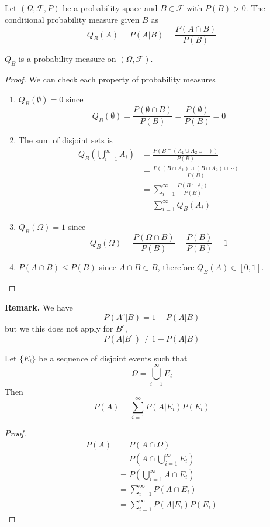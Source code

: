 \begin{definition}
    Let $(\Omega, \mathcal{F}, P)$ be a probability space and $B \in \mathcal{F}$ with $P(B) > 0$. The conditional probability measure given $B$ as 
    \[Q_B(A) = P(A|B) = \frac{P(A \cap B)}{P(B)}\]
\end{definition}
\begin{theorem}
    $Q_B$ is a probability measure on $(\Omega, \mathcal{F})$.
\end{theorem}
\begin{proof}
    We can check each property of probability measures
    \begin{enumerate}[label=(\roman*)]
        \item $Q_B(\emptyset) = 0$ since 
        \[Q_B(\emptyset) = \frac{P(\emptyset \cap B)}{P(B)} = \frac{P(\emptyset)}{P(B)}= 0\]
        \item The sum of disjoint sets is
        \begin{align*}
            Q_B\left(\bigcup_{i=1}^\infty A_i\right) &= \frac{P(B \cap (A_1 \cup A_2 \cup \cdots))}{P(B)}\\
            &= \frac{P((B \cap A_1) \cup (B \cap A_2) \cup \cdots)}{P(B)}\\
            &= \sum_{i=1}^\infty \frac{P(B \cap A_i)}{P(B)}\\
            &= \sum_{i=1}^\infty Q_B(A_i)
        \end{align*}
        \item $Q_B(\Omega) = 1$ since
        \[Q_B(\Omega) = \frac{P(\Omega\cap B)}{P(B)} = \frac{P(B)}{P(B)} = 1\]
        \item $P(A \cap B) \leq P(B)$ since $A \cap B \subset B$, therefore $Q_B(A) \in [0,1]$.
    \end{enumerate}
\end{proof}
\textbf{Remark.} We have 
\[P(A^c|B) = 1 - P(A|B)\]
but we this does not apply for $B^c$,
\[P(A|B^c) \neq 1 - P(A|B)\]
\begin{theorem}
    Let $\{E_i\}$ be a sequence of disjoint events such that 
    \[\Omega = \bigcup_{i=1}^\infty E_i\]
    Then 
    \[P(A) = \sum_{i=1}^\infty P(A | E_i)P(E_i)\]
\end{theorem}
\begin{proof}
    \begin{align*}
        P(A) &= P(A \cap \Omega)\\
        &= P\left(A \cap \bigcup_{i=1}^\infty E_i\right)\\
        &= P\left(\bigcup_{i=1}^\infty A \cap E_i\right)\\
        &= \sum_{i=1}^\infty P(A \cap E_i)\\
        &= \sum_{i=1}^\infty P(A | E_i)P(E_i)
    \end{align*}
\end{proof}
